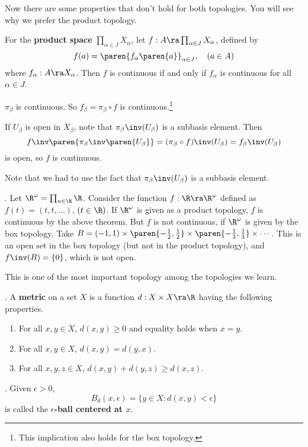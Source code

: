 Now there are some properties that don't hold for both topologies. You will see why we prefer the product topology.

 For the \textbf{product space} \(\prod_{\alpha \in J} X_\alpha\), let \(f: A \ra \prod_{\alpha \in J} X_\alpha\), defined by
\[
    f(a) = \paren{f_\alpha\paren{a}}_{\alpha \in J}, \quad (a \in A)
\]
where \(f_\alpha : A \ra X_\alpha\). Then \(f\) is continuous if and only if \(f_\alpha\) is continuous for all \(\alpha \in J\).

\pf \note{\mimp} \(\pi_\beta\) is continuous. So \(f_\beta = \pi_\beta \circ f\) is continuous.\footnote{This implication also holds for the box topology.}

\note{\mimpd} If \(U_\beta\) is open in \(X_\beta\), note that \(\pi_\beta\inv(U_\beta)\) is a subbasis element. Then
\[
    f\inv\paren{\pi_\beta\inv\paren{U_\beta}} = (\pi_\beta \circ f)\inv(U_\beta) = f_\beta\inv(U_\beta)
\]
is open, so \(f\) is continuous.

Note that we had to use the fact that \(\pi_\beta\inv(U_\beta)\) is a subbasis element.

\ex. Let \(\R^\omega = \prod_{n \in \N}\R\). Consider the function \(f: \R \ra \R^\omega\) defined as \(f(t) = (t, t, \dots)\), \((t\in \R)\). If \(\R^\omega\) is given as a product topology, \(f\) is continuous by the above theorem. But \(f\) is not continuous, if \(\R^\omega\) is given by the box topology. Take \(B = (-1, 1) \times \paren{-\frac{1}{2}, \frac{1}{2}} \times \paren{-\frac{1}{3}, \frac{1}{3}} \times \cdots\). This is an open set in the box topology (but not in the product topology), and \(f\inv(B) = \{0\}\), which is not open.


This is one of the most important topology among the topologies we learn.

.  A \textbf{metric} on a set \(X\) is a function \(d: X\times X \ra \R\) having the following properties.
\begin{enumerate}
    \item For all \(x, y \in X\), \(d(x, y) \geq 0\) and equality holds when \(x = y\).
    \item For all \(x, y \in X\), \(d(x, y) = d(y, x)\).
    \item For all \(x, y, z \in X\), \(d(x, y) + d(y, z) \geq d(x, z)\).
\end{enumerate}

. Given \(\epsilon > 0\),
\[
    B_d(x, \epsilon) = \{y \in X : d(x, y) < \epsilon\}
\]
is called the \textbf{\(\epsilon\)-ball centered at \(x\)}.

